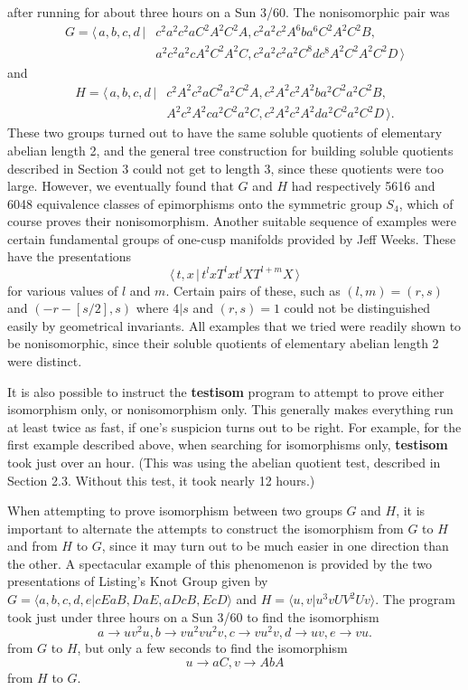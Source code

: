 after running for about three hours on a Sun 3/60.
The nonisomorphic pair was
\begin{eqnarray*}
G  =  \langle \,  a,b,c,d \,  |  & c^2a^2c^2aC^2A^2C^2A, 
c^2a^2c^2A^6ba^6C^2A^2C^2B, \\
 & a^2c^2a^2cA^2C^2A^2C,  c^2a^2c^2a^2C^8dc^8A^2C^2A^2C^2D \,  \rangle
\end{eqnarray*}
and
\begin{eqnarray*}
H = \langle \, a,b,c,d \, | & c^2A^2c^2aC^2a^2C^2A,
c^2A^2c^2A^2ba^2C^2a^2C^2B, \\
 & A^2c^2A^2ca^2C^2a^2C, c^2A^2c^2A^2da^2C^2a^2C^2D \, \rangle.
\end{eqnarray*}
These two groups turned out to have the same soluble quotients of elementary
abelian length 2, and the general tree construction for building soluble
quotients described in Section 3 could not get to length 3, since these
quotients were too large. However, we eventually found that $G$ and $H$
had respectively 5616 and 6048 equivalence classes of epimorphisms onto the
symmetric group $S_4$, which of course proves their nonisomorphism.
Another suitable sequence of examples were certain fundamental groups of
one-cusp manifolds provided by Jeff Weeks. These have the presentations
\begin{displaymath}
\langle \, t,x \, | \, t^lxT^lxt^lXT^{l+m}X \, \rangle
\end{displaymath}
for various values of $l$ and $m$. Certain pairs of these, such as
$(l,m) = (r,s)$ and $(-r-[s/2],s)$ where  $4|s$  and  $(r,s)=1$  could not be
distinguished easily by geometrical invariants. All examples that we
tried were readily shown to be nonisomorphic, since their soluble
quotients of elementary abelian length 2 were distinct.

It is also possible to instruct the {\bf testisom} program to attempt to prove
either isomorphism only, or nonisomorphism only. This generally makes
everything run at least twice as fast, if one's suspicion turns out to be
right. For example, for the first example described above, when searching
for isomorphisms only, {\bf testisom} took just over an hour. (This was using
the abelian quotient test, described in Section 2.3. Without this test, it
took nearly 12 hours.)

When attempting to prove isomorphism between two groups  $G$  and  $H$,
it is important to alternate the attempts to construct the isomorphism from
$G$ to $H$  and  from  $H$  to  $G$, since it may turn out to be
much easier in one direction than the other. A spectacular example of
this phenomenon is provided by the two presentations of Listing's Knot Group
given by
$G = \langle a,b,c,d,e | cEaB, DaE, aDcB, EcD \rangle$
and
$H = \langle u,v | u^3vUV^2Uv \rangle$.
The program took just under three hours on a Sun 3/60 to find the isomorphism
\begin{displaymath}
a \rightarrow uv^2u, b \rightarrow vu^2vu^2v,
c \rightarrow vu^2v, d \rightarrow uv, e \rightarrow vu.
\end{displaymath}
from $G$ to $H$,
but only a few seconds to find the isomorphism
\begin{displaymath}
u \rightarrow aC,  v \rightarrow AbA
\end{displaymath}
from  $H$  to  $G$.

